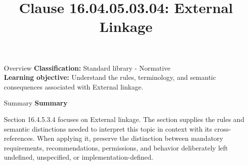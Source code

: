 \documentclass[10pt,letterpaper]{article}
\title{Clause 16.04.05.03.04: External Linkage}
\author{}
\date{}
\begin{document}
\maketitle
\begin{CornellOverviewBox}{Overview}
\textbf{Classification:} Standard library - Normative\\[2pt]
\textbf{Learning objective:} Understand the rules, terminology, and semantic consequences associated with External linkage.
\end{CornellOverviewBox}\begin{CornellSummaryBox}{Summary}
{\sffamily\bfseries\color{Accent} Summary}\par\vspace{3pt}Section 16.4.5.3.4 focuses on External linkage. The section supplies the rules and semantic distinctions needed to interpret this topic in context with its cross-references. When applying it, preserve the distinction between mandatory requirements, recommendations, permissions, and behavior deliberately left undefined, unspecified, or implementation-defined.
\end{CornellSummaryBox}
\end{document}
